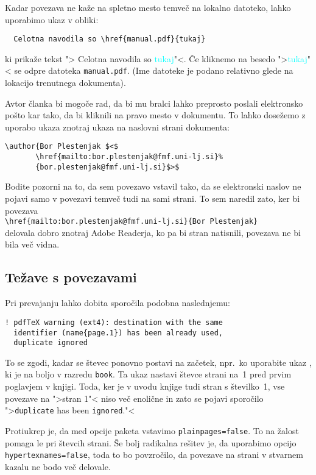 Kadar povezava ne kaže na spletno mesto temveč na lokalno datoteko,
lahko uporabimo ukaz  v obliki: 
\begin{verbatim}
  Celotna navodila so \href{manual.pdf}{tukaj}
\end{verbatim}
ki prikaže tekst "> Celotna navodila so \textcolor{cyan}{tukaj}"<.
Če kliknemo na besedo
">\textcolor{cyan}{tukaj}"<
se odpre datoteka \texttt{manual.pdf}. (Ime datoteke je podano 
relativno glede na lokacijo trenutnega dokumenta).

Avtor članka bi mogoče rad, da bi mu bralci lahko preprosto poslali
elektronsko pošto kar tako, da bi kliknili na pravo mesto v dokumentu.
To lahko dosežemo z uporabo ukaza  znotraj ukaza 
na naslovni strani dokumenta:
\begin{code}
\begin{verbatim}
\author{Bor Plestenjak $<$
       \href{mailto:bor.plestenjak@fmf.uni-lj.si}%
       {bor.plestenjak@fmf.uni-lj.si}$>$
\end{verbatim}
\end{code}
Bodite pozorni na to, da sem povezavo vstavil tako,
da se elektronski naslov ne pojavi samo v povezavi temveč tudi na 
sami strani. To sem naredil zato, ker bi povezava\\
\verb+\href{mailto:bor.plestenjak@fmf.uni-lj.si}{Bor Plestenjak}+\\
delovala dobro znotraj Adobe Readerja, ko pa bi stran natisnili, 
povezava ne bi bila več vidna.

\subsection{Težave s povezavami}

Pri prevajanju lahko dobita sporočila podobna naslednjemu:
\begin{verbatim}
! pdfTeX warning (ext4): destination with the same
  identifier (name{page.1}) has been already used,
  duplicate ignored
\end{verbatim}
To se zgodi, kadar se števec ponovno postavi na začetek,
npr.~ko uporabite ukaz , ki je na boljo v razredu
\texttt{book}. Ta ukaz nastavi števce strani na~1 pred prvim poglavjem
v knjigi. Toda, ker je v uvodu knjige tudi stran s številko~1, vse
povezave na ">stran 1"< niso več enolične in zato se pojavi 
sporočilo ">\verb+duplicate+ has been \verb+ignored+."<

Protiukrep je, da med opcije paketa  vstavimo \texttt{plainpages=false}. To na žalost pomaga le pri števcih strani. Še bolj
radikalna rešitev je, da uporabimo opcijo
\texttt{hypertexnames=false}, toda to bo povzročilo, da povezave na strani
v stvarnem kazalu ne bodo več delovale.

